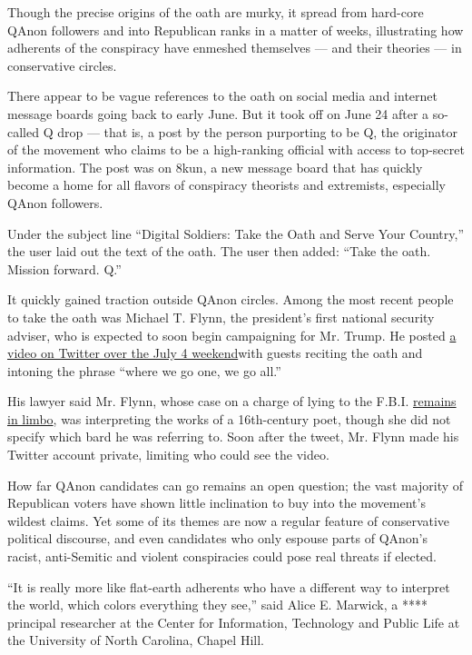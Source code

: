 Though the precise origins of the oath are murky, it spread from
hard-core QAnon followers and into Republican ranks in a matter of
weeks, illustrating how adherents of the conspiracy have enmeshed
themselves --- and their theories --- in conservative circles.

There appear to be vague references to the oath on social media and
internet message boards going back to early June. But it took off on
June 24 after a so-called Q drop --- that is, a post by the person
purporting to be Q, the originator of the movement who claims to be a
high-ranking official with access to top-secret information. The post
was on 8kun, a new message board that has quickly become a home for all
flavors of conspiracy theorists and extremists, especially QAnon
followers.

Under the subject line ``Digital Soldiers: Take the Oath and Serve Your
Country,'' the user laid out the text of the oath. The user then added:
``Take the oath. Mission forward. Q.''

It quickly gained traction outside QAnon circles. Among the most recent
people to take the oath was Michael T. Flynn, the president's first
national security adviser, who is expected to soon begin campaigning for
Mr. Trump. He posted
\href{https://www.cnn.com/2020/07/07/politics/michael-flynn-qanon-video/index.html}{a
video on Twitter over the July 4 weekend}with guests reciting the oath
and intoning the phrase ``where we go one, we go all.''

His lawyer said Mr. Flynn, whose case on a charge of lying to the F.B.I.
\href{https://www.nytimes.com/2020/07/09/us/politics/michael-flynn-appeals-court.html?referringSource=articleShare}{remains
in limbo}, was interpreting the works of a 16th-century poet, though she
did not specify which bard he was referring to. Soon after the tweet,
Mr. Flynn made his Twitter account private, limiting who could see the
video.

How far QAnon candidates can go remains an open question; the vast
majority of Republican voters have shown little inclination to buy into
the movement's wildest claims. Yet some of its themes are now a regular
feature of conservative political discourse, and even candidates who
only espouse parts of QAnon's racist, anti-Semitic and violent
conspiracies could pose real threats if elected.

``It is really more like flat-earth adherents who have a different way
to interpret the world, which colors everything they see,'' said Alice
E. Marwick, a **** principal researcher at the Center for Information,
Technology and Public Life at the University of North Carolina, Chapel
Hill.

